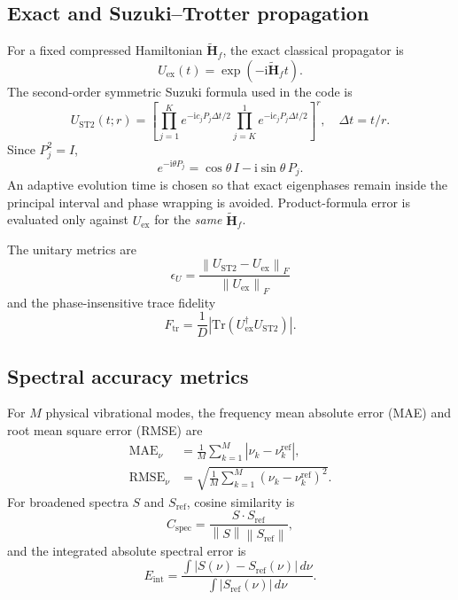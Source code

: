 \documentclass[aip,jcp,reprint,amsmath,amssymb,floatfix]{revtex4-2}
\newcommand{\Hf}{\widetilde{\mathbf{H}}_{f}}
\newcommand{\Tr}{\mathrm{Tr}}
\newcommand{\norm}[1]{\left\lVert #1 \right\rVert}
\newcommand{\ii}{\mathrm{i}}
\begin{document}
\subsection{Exact and Suzuki--Trotter propagation}
For a fixed compressed Hamiltonian $\Hf$, the exact classical propagator is
\begin{equation}
U_{\mathrm{ex}}(t)=\exp(-\ii\Hf t).
\label{eq:exactprop}
\end{equation}
The second-order symmetric Suzuki formula used in the code is\cite{Trotter1959Product,Suzuki1976Generalized}
\begin{equation}
U_{\mathrm{ST2}}(t;r)=
\left[
\prod_{j=1}^{K}e^{-\ii c_jP_j\Delta t/2}
\prod_{j=K}^{1}e^{-\ii c_jP_j\Delta t/2}
\right]^r,
\quad \Delta t=t/r.
\label{eq:st2}
\end{equation}
Since $P_j^2=I$,
\begin{equation}
e^{-\ii\theta P_j}=\cos\theta\,I-\ii\sin\theta\,P_j.
\label{eq:pauliexp}
\end{equation}
An adaptive evolution time is chosen so that exact eigenphases remain inside the principal interval and phase wrapping is avoided. Product-formula error is evaluated only against $U_{\mathrm{ex}}$ for the \emph{same} $\Hf$.

The unitary metrics are
\begin{equation}
\epsilon_U=\frac{\norm{U_{\mathrm{ST2}}-U_{\mathrm{ex}}}_F}
{\norm{U_{\mathrm{ex}}}_F}
\end{equation}
and the phase-insensitive trace fidelity
\begin{equation}
F_{\mathrm{tr}}=\frac{1}{D}
\left|\Tr\left(U_{\mathrm{ex}}^{\dagger}U_{\mathrm{ST2}}\right)\right|.
\label{eq:tracefid}
\end{equation}

\subsection{Spectral accuracy metrics}
For $M$ physical vibrational modes, the frequency mean absolute error (MAE) and root mean square error (RMSE) are
\begin{align}
\mathrm{MAE}_{\nu}&=\frac{1}{M}\sum_{k=1}^{M}|\nu_k-\nu_k^{\mathrm{ref}}|,\\
\mathrm{RMSE}_{\nu}&=\sqrt{\frac{1}{M}\sum_{k=1}^{M}(\nu_k-\nu_k^{\mathrm{ref}})^2}.
\end{align}
For broadened spectra $S$ and $S_{\mathrm{ref}}$, cosine similarity is
\begin{equation}
C_{\mathrm{spec}}=
\frac{S\cdot S_{\mathrm{ref}}}{\norm{S}\norm{S_{\mathrm{ref}}}},
\label{eq:cosine}
\end{equation}
and the integrated absolute spectral error is
\begin{equation}
E_{\mathrm{int}}=
\frac{\int|S(\nu)-S_{\mathrm{ref}}(\nu)|\,d\nu}
{\int|S_{\mathrm{ref}}(\nu)|\,d\nu}.
\label{eq:integrated}
\end{equation}
\end{document}
